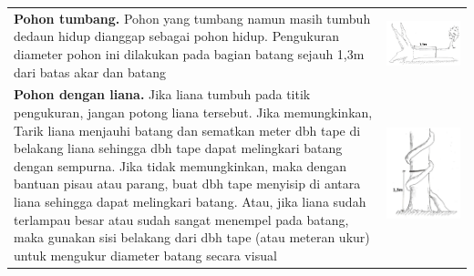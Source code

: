 \documentclass[
]{book}
\begin{document}
\begin{longtable}[]{@{}
  >{\raggedright\arraybackslash}p{}
  >{\raggedright\arraybackslash}p{}@{}}
\textbf{Pohon tumbang.} Pohon yang tumbang namun masih tumbuh dedaun hidup dianggap sebagai pohon hidup. Pengukuran diameter pohon ini dilakukan pada bagian batang sejauh 1,3m dari batas akar dan batang & \includegraphics{images/vtb8.jpg} \\
\textbf{Pohon dengan liana.} Jika liana tumbuh pada titik pengukuran, jangan potong liana tersebut. Jika memungkinkan, Tarik liana menjauhi batang dan sematkan meter dbh tape di belakang liana sehingga dbh tape dapat melingkari batang dengan sempurna. Jika tidak memungkinkan, maka dengan bantuan pisau atau parang, buat dbh tape menyisip di antara liana sehingga dapat melingkari batang. Atau, jika liana sudah terlampau besar atau sudah sangat menempel pada batang, maka gunakan sisi belakang dari dbh tape (atau meteran ukur) untuk mengukur diameter batang secara visual & \includegraphics{images/vtb9.jpg} \\

\end{longtable}
\end{document}
